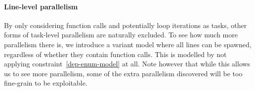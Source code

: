 \paragraph{Line-level parallelism}
By only considering function calls and potentially loop iterations as tasks, other forms of task-level parallelism are naturally excluded.
To see how much more parallelism there is, we introduce a variant model where all lines can be spawned, regardless of whether they contain function calls.
This is modelled by not applying constraint~\ref{dep-enum-model} at all.
Note however that while this allows us to see more parallelism, some of the extra parallelism discovered will be too fine-grain to be exploitable.




































